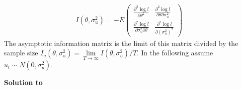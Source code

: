 \documentclass[a4paper]{scrartcl}
\begin{document}
\begin{align*}
I(\theta,\sigma_u^2) = -E
\begin{pmatrix}
\frac{\partial^2 \log l}{\partial \theta^2} & \frac{\partial^2 \log l}{\partial \theta  \partial \sigma_u^2}  \\
\frac{\partial^2 \log l}{\partial \sigma_u^2  \partial \theta} & \frac{\partial^2 \log l}{\partial (\sigma_u^2)^2}  
\end{pmatrix}
\end{align*}
The asymptotic information matrix is the limit of this matrix divided by the sample size $I_a(\theta, \sigma_u^2)=\lim\limits_{T\rightarrow \infty} I(\theta, \sigma_u^2)/T$.
In the following assume $u_t\sim N(0,\sigma_u^2)$.
\begin{solution}\textbf{Solution to }\end{solution}
\end{document}
